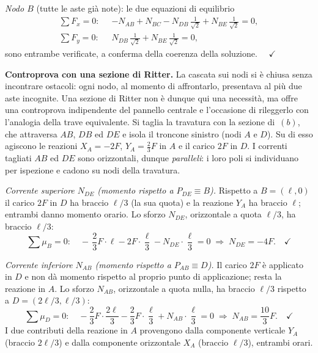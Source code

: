 \begin{esercizio}
\begin{svolgimento}
		\smallskip
		\textit{Nodo $B$} (tutte le aste già note): le due
		equazioni di equilibrio
	\[
	\begin{aligned}
		\sum F_x = 0:\;\;
		&-N_{AB} + N_{BC}
		- N_{DB}\,\frac{1}{\sqrt2} + N_{BE}\,\frac{1}{\sqrt2}
		= 0,\\[2pt]
		\sum F_y = 0:\;\;
		&N_{DB}\,\frac{1}{\sqrt2} + N_{BE}\,\frac{1}{\sqrt2} = 0,
	\end{aligned}
	\]
		sono entrambe verificate, a conferma della coerenza
		della soluzione. $\quad\checkmark$
		



		
		\noindent\textbf{Controprova con una sezione di
			Ritter.}
		La cascata sui nodi si è chiusa senza incontrare
		ostacoli: ogni nodo, al momento di affrontarlo,
		presentava al più due aste incognite. Una sezione
		di Ritter non è dunque qui una necessità, ma offre
		una controprova indipendente del pannello centrale
		e l'occasione di rileggerlo con l'analogia della
		trave equivalente. Si taglia la travatura con la
		sezione di \,$(b)$,
		che attraversa $AB$, $DB$ ed $DE$ e isola il
		troncone sinistro (nodi $A$ e $D$). Su di esso
		agiscono le reazioni $X_A = -2F$, $Y_A = \tfrac23 F$
		in $A$ e il carico $2F$ in $D$. I correnti tagliati
		$AB$ ed $DE$ sono orizzontali, dunque \emph{paralleli}:
		i loro poli si individuano per ispezione e cadono su
		nodi della travatura.
		
		\smallskip
		\textit{Corrente superiore $N_{DE}$
			(momento rispetto a $P_{DE}\equiv B$).}
		Rispetto a $B=(\ell,0)$ il carico $2F$ in $D$ ha
		braccio $\ell/3$ (la sua quota) e la reazione $Y_A$
		ha braccio $\ell$; entrambi danno momento orario.
		Lo sforzo $N_{DE}$, orizzontale a quota $\ell/3$, ha
		braccio $\ell/3$:
		\[
		\sum \mu_B = 0:\quad
		-\,\frac{2}{3}F\cdot\ell - 2F\cdot\frac{\ell}{3}
		- N_{DE}\cdot\frac{\ell}{3} = 0
		\;\Rightarrow\;
		N_{DE} = -4F. \quad\checkmark
		\]
		
		\smallskip
		\textit{Corrente inferiore $N_{AB}$
			(momento rispetto a $P_{AB}\equiv D$).}
		Il carico $2F$ è applicato in $D$ e non dà momento
		rispetto al proprio punto di applicazione; resta la
		reazione in $A$. Lo sforzo $N_{AB}$, orizzontale a
		quota nulla, ha braccio $\ell/3$ rispetto a
		$D=(2\ell/3,\ell/3)$:
		\[
		\sum \mu_D = 0:\quad
		-\frac{2}{3}F\cdot\frac{2\ell}{3}
		- \frac{2}{3}F\cdot\frac{\ell}{3}
		+ N_{AB}\cdot\frac{\ell}{3} = 0
		\;\Rightarrow\;
		N_{AB} = \frac{10}{3}F. \quad\checkmark
		\]
		I due contributi della reazione in $A$ provengono
		dalla componente verticale $Y_A$ (braccio $2\ell/3$)
		e dalla componente orizzontale $X_A$ (braccio
		$\ell/3$), entrambi orari.
		

\end{svolgimento}
\end{esercizio}
